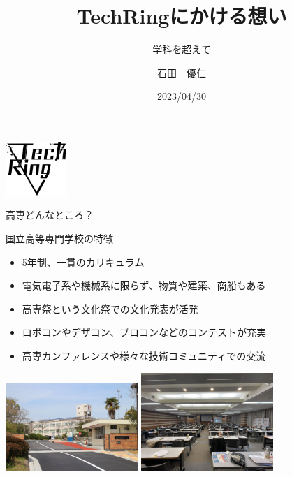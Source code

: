 \documentclass[dvipdfmx]{beamer}
\title{TechRingにかける想い}
\subtitle{学科を超えて}
\author[Jin]{石田　優仁}
\institute[TechRing]{奈良高専TechRing}
\date[2023/04/30]{2023/04/30}
\begin{document}
\begin{frame}
  \begin{flushright}
      \includegraphics[width=2.3cm]{pic/Logo.png}
  \end{flushright}
  \titlepage
\end{frame}

\begin{frame}{高専どんなところ？}

  \begin{block}{国立高等専門学校の特徴}
    \begin{itemize}
      \setlength{\itemsep}{1mm}
      \item 5年制、一貫のカリキュラム
      \item 電気電子系や機械系に限らず、物質や建築、商船もある
      \item 高専祭という文化祭での文化発表が活発
      \item ロボコンやデザコン、プロコンなどのコンテストが充実
      \item 高専カンファレンスや様々な技術コミュニティでの交流
    \end{itemize}
  \end{block}

  \begin{center}
    \includegraphics[width=5cm]{pic/nitnc.jpg}
    \includegraphics[width=5cm]{pic/Conf.jpg}
  \end{center}

\end{frame}
\end{document}
